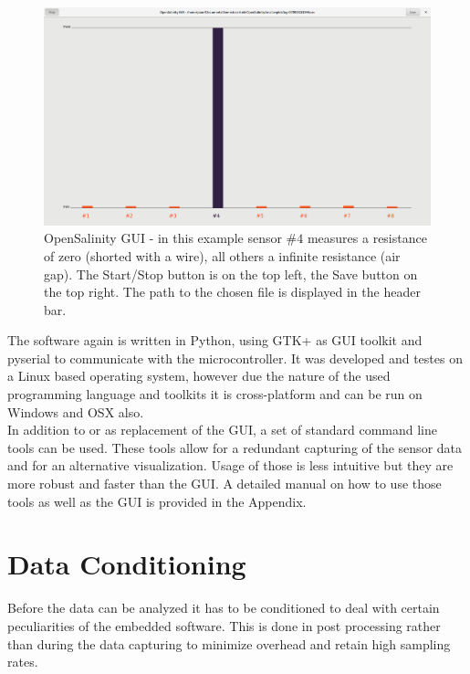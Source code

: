 \begin{figure}[H]
	\begin{center}
		\includegraphics[width=\textwidth]{images/UI.png}
		\caption{OpenSalinity GUI - in this example sensor $\#4$ measures a resistance of zero (shorted with a wire), all others a infinite resistance (air gap). The Start/Stop button is on the top left, the Save button on the top right. The path to the chosen file is displayed in the header bar.}
		\label{fig:opamp}
	\end{center}
\end{figure}

The software again is written in Python, using GTK+ as GUI toolkit and pyserial to communicate with the microcontroller. It was developed and testes on a Linux based operating system, however due the nature of the used programming language and toolkits it is cross-platform and can be run on Windows and OSX also.\\

In addition to or as replacement of the GUI, a set of standard command line tools can be used. These tools allow for a redundant capturing of the sensor data and for an alternative visualization. Usage of those is less intuitive but they are more robust and faster than the GUI. A detailed manual on how to use those tools as well as the GUI is provided in the Appendix.

\section{Data Conditioning}

Before the data can be analyzed it has to be conditioned to deal with certain peculiarities of the embedded software. This is done in post processing rather than during the data capturing to minimize overhead and retain high sampling rates.\\


